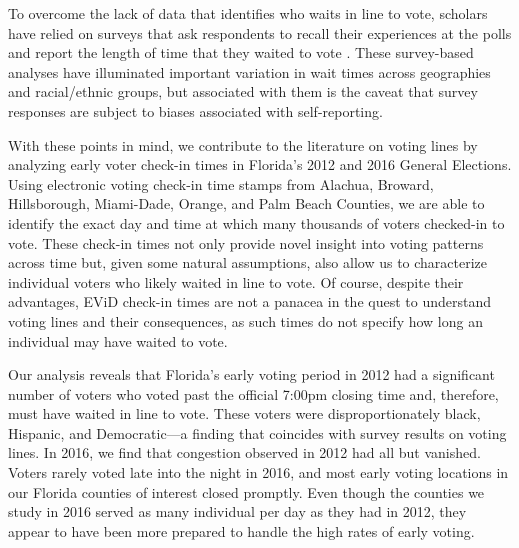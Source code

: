 \documentclass[12pt,titlepage]{article}
\begin{document}
To overcome the lack of data that identifies who waits in line to
vote, scholars have relied on surveys that ask respondents to recall
their experiences at the polls and report the length of time that they
waited to vote \citep{stewart:waitingtovote2012,
  pettigrew:racegapwaittimes}.  These survey-based analyses have
illuminated important variation in wait times across geographies and
racial/ethnic groups, but associated with them is the caveat that
survey responses are subject to biases associated with self-reporting.

With these points in mind, we contribute to the literature on voting
lines by analyzing early voter check-in times in Florida's 2012 and
2016 General Elections. Using electronic voting check-in time stamps
from Alachua, Broward, Hillsborough, Miami-Dade, Orange, and Palm
Beach Counties, we are able to identify the exact day and time at
which many thousands of voters checked-in to vote.  These check-in
times not only provide novel insight into voting patterns across time
but, given some natural assumptions, also allow us to characterize
individual voters who likely waited in line to vote. Of course,
despite their advantages, EViD check-in times are not a panacea in the
quest to understand voting lines and their consequences, as such times
do not specify how long an individual may have waited to vote.  


Our analysis reveals that Florida's early voting period in 2012 had a
significant number of voters who voted past the official 7:00pm
closing time and, therefore, must have waited in line to vote.  These
voters were disproportionately black, Hispanic, and Democratic---a
finding that coincides with survey results on voting lines.  In 2016,
we find that congestion observed in 2012 had all but vanished.  Voters
rarely voted late into the night in 2016, and most early voting
locations in our Florida counties of interest closed promptly.  Even
though the counties we study in 2016 served as many individual per day
as they had in 2012, they appear to have been more prepared to handle
the high rates of early voting.
  
\end{document}
